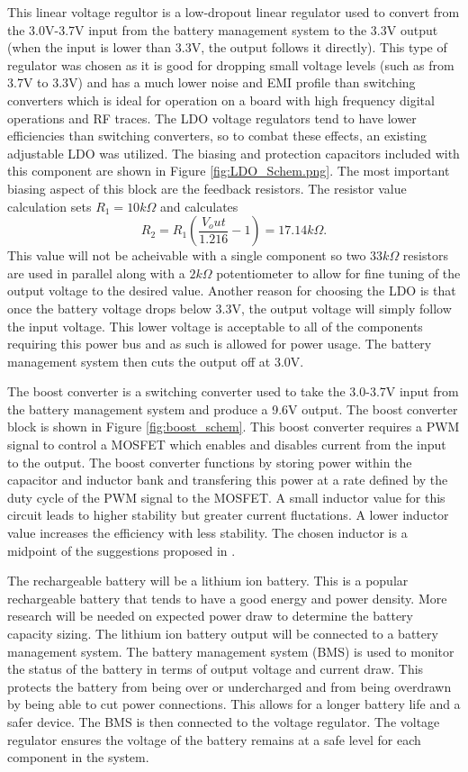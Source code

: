 \documentclass[12pt]{article}
\begin{document}
This linear voltage regultor is a low-dropout linear regulator used to convert from the 3.0V-3.7V input from the battery management system to the 3.3V output (when the input is lower than 3.3V, the output follows it directly). This type of regulator was chosen as it is good for dropping small voltage levels (such as from 3.7V to 3.3V) and has a much lower noise and EMI profile than switching converters which is ideal for operation on a board with high frequency digital operations and RF traces. The LDO voltage regulators tend to have lower efficiencies than switching converters, so to combat these effects, an existing adjustable LDO was utilized. The biasing and protection capacitors included with this component are shown in Figure \ref{fig:LDO_Schem.png}. The most important biasing aspect of this block are the feedback resistors. The resistor value calculation sets $R_1 = 10k\Omega$ and calculates
\[ R_2 = R_1 (\frac{V_out}{1.216} - 1) = 17.14k\Omega.\]
This value will not be acheivable with a single component so two $33k\Omega$ resistors are used in parallel along with a $2k\Omega$ potentiometer to allow for fine tuning of the output voltage to the desired value. Another reason for choosing the LDO is that once the battery voltage drops below 3.3V, the output voltage will simply follow the input voltage. This lower voltage is acceptable to all of the components requiring this power bus and as such is allowed for power usage. The battery management system then cuts the output off at 3.0V.

The boost converter is a switching converter used to take the 3.0-3.7V input from the battery management system and produce a 9.6V output. The boost converter block is shown in Figure \ref{fig:boost_schem}. This boost converter requires a PWM signal to control a MOSFET which enables and disables current from the input to the output. The boost converter functions by storing power within the capacitor and inductor bank and transfering this power at a rate defined by the duty cycle of the PWM signal to the MOSFET. A small inductor value for this circuit leads to higher stability but greater current fluctations. A lower inductor value increases the efficiency with less stability. The chosen inductor is a midpoint of the suggestions proposed in \cite{boost}.

The rechargeable battery will be a lithium ion battery. This is a popular rechargeable battery that tends to have a good energy and power density. More research will be needed on expected power draw to determine the battery capacity sizing. The lithium ion battery output will be connected to a battery management system. The battery management system (BMS) is used to monitor the status of the battery in terms of output voltage and current draw. This protects the battery from being over or undercharged and from being overdrawn by being able to cut power connections. This allows for a longer battery life and a safer device. The BMS is then connected to the voltage regulator. The voltage regulator ensures the voltage of the battery remains at a safe level for each component in the system.
\end{document}
